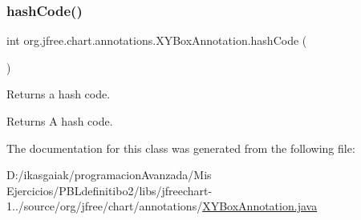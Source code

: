 \subsubsection{\texorpdfstring{hash\+Code()}{hashCode()}}
{\footnotesize\ttfamily int org.\+jfree.\+chart.\+annotations.\+X\+Y\+Box\+Annotation.\+hash\+Code (\begin{DoxyParamCaption}{ }\end{DoxyParamCaption})}

Returns a hash code.

\begin{DoxyReturn}{Returns}
A hash code. 
\end{DoxyReturn}


The documentation for this class was generated from the following file\+:\begin{DoxyCompactItemize}
\item 
D\+:/ikasgaiak/programacion\+Avanzada/\+Mis Ejercicios/\+P\+B\+Ldefinitibo2/libs/jfreechart-\/1../source/org/jfree/chart/annotations/\mbox{\hyperlink{_x_y_box_annotation_8java}{X\+Y\+Box\+Annotation.\+java}}\end{DoxyCompactItemize}
